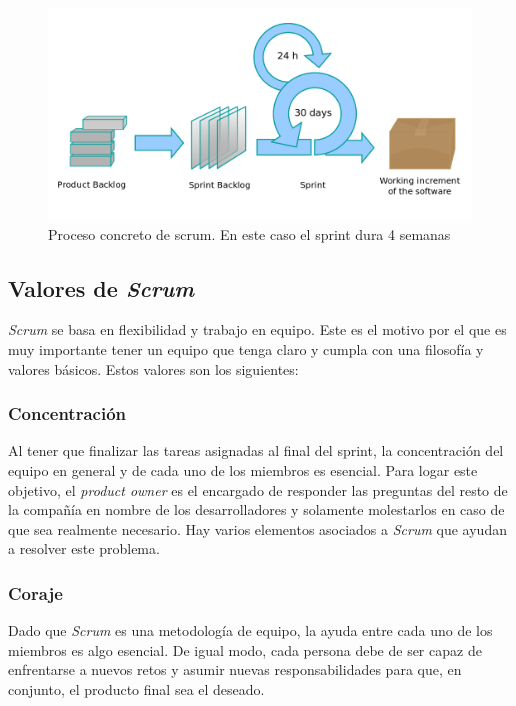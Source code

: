 \begin{figure}[H]
		\includegraphics[width=\textwidth,height=\textheight,keepaspectratio]{./img/scrumprocess.png}
	\caption{Proceso concreto de scrum. En este caso el sprint dura 4 semanas}
	\label{fig:scrumproceso}
\end{figure}

\subsection{Valores de \textit{Scrum}}

\textit{Scrum} se basa en flexibilidad y trabajo en equipo. Este es el motivo por el que es muy importante tener un equipo que tenga claro y cumpla con una filosofía y valores básicos. Estos valores son los siguientes:

\subsubsection{Concentración}

Al tener que finalizar las tareas asignadas al final del sprint, la concentración del equipo en general y de cada uno de los miembros es esencial. Para logar este objetivo, el \textit{product owner} es el encargado de responder las preguntas del resto de la compañía en nombre de los desarrolladores y solamente molestarlos en caso de que sea realmente necesario. Hay varios elementos asociados a \textit{Scrum} que ayudan a resolver este problema.

\subsubsection{Coraje}

Dado que \textit{Scrum} es una metodología de equipo, la ayuda entre cada uno de los miembros es algo esencial. De igual modo, cada persona debe de ser capaz de enfrentarse a nuevos retos y asumir nuevas responsabilidades para que, en conjunto, el producto final sea el deseado. 

